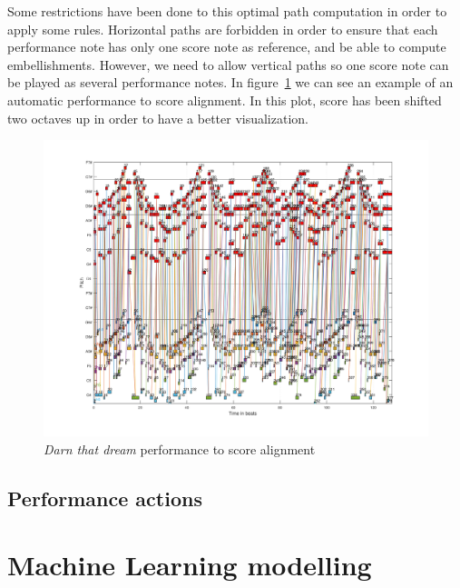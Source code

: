 Some restrictions have been done to this optimal path computation in order to apply some rules. Horizontal paths are forbidden in order to ensure that each performance note has only one score note as reference, and be able to compute embellishments. However, we need to allow vertical paths so one score note can be played as several performance notes. In figure~\ref{fig:darn_auto_alignment} we can see an example of an automatic performance to score alignment. In this plot, score has been shifted two octaves up in order to have a better visualization.

\begin{figure}[ht!]
\caption{\textit{Darn that dream} performance to score alignment}
\label{fig:darn_auto_alignment}
\centering
\includegraphics[width=\textwidth]{Figures/Darn_that_dream_auto.pdf}
\end{figure}


\subsection{Performance actions}

\section{Machine Learning modelling}
\cleardoublepage

